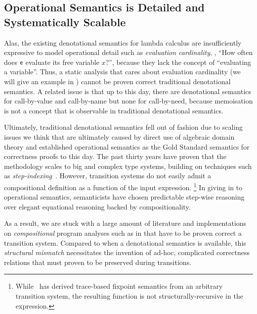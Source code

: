\subsection{Operational Semantics is Detailed and Systematically Scalable}

Alas, the existing denotational semantics for lambda calculus are insufficiently
expressive to model operational detail such as \emph{evaluation cardinality},
\eg, ``How often does $\mathsf{e}$ evaluate its free variable $x$?'', because they lack
the concept of ``evaluating a variable''.
Thus, a static analysis that cares about evaluation cardinality (we will give
an example in ) cannot be proven correct \wrt traditional
denotational semantics.
A related issue is that up to this day, there are denotational semantics for
call-by-value and call-by-name but none for call-by-need, because memoisation is
not a concept that is observable in traditional denotational semantics.

Ultimately, traditional denotational semantics fell out of fashion due to
scaling issues we think that are ultimately caused by direct use of algebraic
domain theory and \citet{WrightFelleisen:94} established operational semantics
as the Gold Standard semantics for correctness proofs to this day.
The past thirty years have proven that the methodology scales to
big and complex type systems, building on techniques such as
\emph{step-indexing}~\citep{AppelMcAllester:01,DreyerAhmedBirkedal:11}.
However, transition systems do not easily admit a compositional definition as a
function of the input expression.%
\footnote{While~\citet{Cousot:02} has derived trace-based fixpoint
semantics from an arbitrary transition system, the resulting function is not
structurally-recursive in the expression.}
In giving in to operational semantics, semanticists have chosen predictable
step-wise reasoning over elegant equational reasoning backed by
compositionality.


As a result, we are stuck with a large amount of literature and implementations
on \emph{compositional} program analyses such as in \citet{cardinality-ext}
that have to be proven correct \wrt a transition system.
Compared to when a denotational semantics is available, this \emph{structural
mismatch} necessitates the invention of ad-hoc, complicated correctness
relations that must proven to be preserved during transitions.

